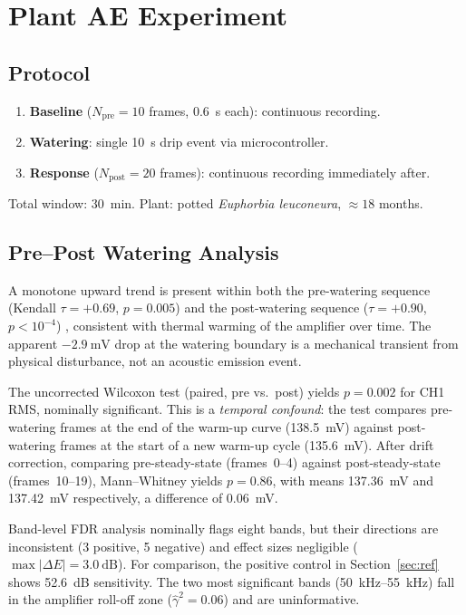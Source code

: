 \documentclass[10pt,a4paper,twocolumn]{article}
\newcommand{\gammasq}{\ensuremath{\hat{\gamma}^2}}
\begin{document}
\section{Plant AE Experiment}

\subsection{Protocol}

\begin{enumerate}[leftmargin=1.6em,itemsep=1pt,topsep=2pt]
  \item \textbf{Baseline} ($N_\text{pre}=10$ frames, \SI{0.6}{\second} each): continuous recording.
  \item \textbf{Watering}: single \SI{10}{\second} drip event via microcontroller.
  \item \textbf{Response} ($N_\text{post}=20$ frames): continuous recording immediately after.
\end{enumerate}

Total window: \SI{30}{\minute}. Plant: potted \textit{Euphorbia leuconeura}, $\approx18$ months.

\subsection{Pre--Post Watering Analysis}

A monotone upward trend is present within both the pre-watering sequence (Kendall $\tau=+0.69$, $p=0.005$) and the post-watering sequence ($\tau=+0.90$, $p<10^{-4}$) , consistent with thermal warming of the amplifier over time. The apparent $-\SI{2.9}{\milli\volt}$ drop at the watering boundary is a mechanical transient from physical disturbance, not an acoustic emission event.

The uncorrected Wilcoxon test (paired, pre vs.\ post) yields $p=0.002$ for CH1 RMS, nominally significant. This is a \emph{temporal confound}: the test compares pre-watering frames at the end of the warm-up curve (\SI{138.5}{\milli\volt}) against post-watering frames at the start of a new warm-up cycle (\SI{135.6}{\milli\volt}). After drift correction, comparing pre-steady-state (frames~0--4) against post-steady-state (frames~10--19), Mann--Whitney yields $p=0.86$, with means \SI{137.36}{\milli\volt} and \SI{137.42}{\milli\volt} respectively, a difference of \SI{0.06}{\milli\volt}.

Band-level FDR analysis nominally flags eight bands, but their directions are inconsistent (3 positive, 5 negative) and effect sizes negligible ($\max|\Delta E|=\SI{3.0}{\deci\bel}$). For comparison, the positive control in Section~\ref{sec:ref} shows \SI{+52.6}{\deci\bel} sensitivity. The two most significant bands (\SIrange{50}{55}{\kilo\hertz}) fall in the amplifier roll-off zone ($\gammasq=0.06$) and are uninformative.
\end{document}
